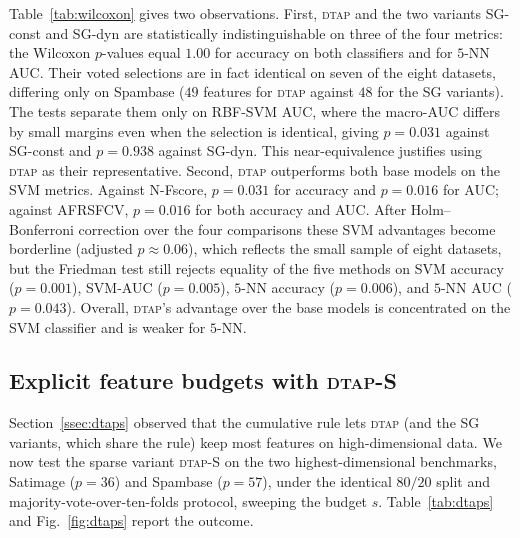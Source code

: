 \documentclass[]{interact}
\theoremstyle{plain}
\theoremstyle{definition}
\theoremstyle{remark}
\newcommand{\dtap}{\textsc{dtap}}
\begin{document}
Table~\ref{tab:wilcoxon} gives two observations. First, \dtap{} and the two variants SG-const and SG-dyn are statistically indistinguishable on three of the four metrics: the Wilcoxon $p$-values equal $1.00$ for accuracy on both classifiers and for $5$-NN AUC. Their voted selections are in fact identical on seven of the eight datasets, differing only on Spambase ($49$ features for \dtap{} against $48$ for the SG variants). The tests separate them only on RBF-SVM AUC, where the macro-AUC differs by small margins even when the selection is identical, giving $p=0.031$ against SG-const and $p=0.938$ against SG-dyn. This near-equivalence justifies using \dtap{} as their representative. Second, \dtap{} outperforms both base models on the SVM metrics. Against N-Fscore, $p=0.031$ for accuracy and $p=0.016$ for AUC; against AFRSFCV, $p=0.016$ for both accuracy and AUC. After Holm--Bonferroni correction over the four comparisons these SVM advantages become borderline (adjusted $p\approx0.06$), which reflects the small sample of eight datasets, but the Friedman test still rejects equality of the five methods on SVM accuracy ($p=0.001$), SVM-AUC ($p=0.005$), $5$-NN accuracy ($p=0.006$), and $5$-NN AUC ($p=0.043$). Overall, \dtap's advantage over the base models is concentrated on the SVM classifier and is weaker for $5$-NN.

\subsection{Explicit feature budgets with \dtap-S}\label{ssec:dtaps-exp}
Section~\ref{ssec:dtaps} observed that the cumulative rule lets \dtap{} (and the SG variants, which share the rule) keep most features on high-dimensional data. We now test the sparse variant \dtap-S on the two highest-dimensional benchmarks, Satimage ($p{=}36$) and Spambase ($p{=}57$), under the identical $80/20$ split and majority-vote-over-ten-folds protocol, sweeping the budget $s$. Table~\ref{tab:dtaps} and Fig.~\ref{fig:dtaps} report the outcome.
\end{document}
